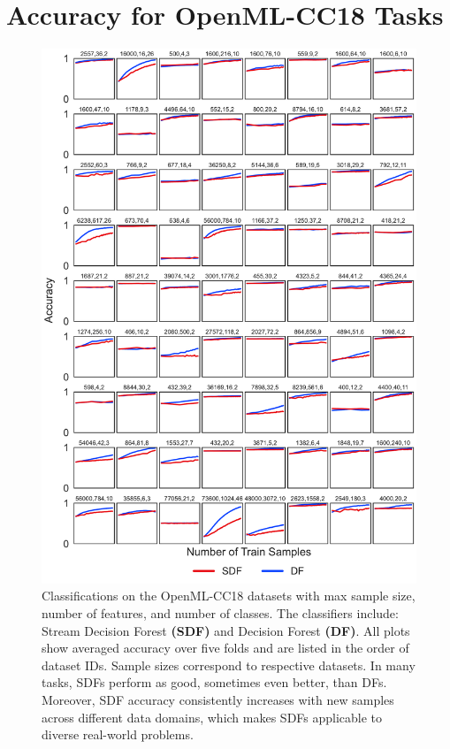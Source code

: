 \clearpage

\section{Accuracy for OpenML-CC18 Tasks}
\label{app:cc18}

\begin{figure}[!htpb]
\centering
\includegraphics[width=0.75\columnwidth]{cc18_wide}
  \caption{Classifications on the OpenML-CC18 datasets with max sample size, number of features, and number of classes. The classifiers include: Stream Decision Forest \textbf{(SDF)} and Decision Forest \textbf{(DF)}. 
  All plots show averaged accuracy over five folds and are listed in the order of dataset IDs. Sample sizes correspond to respective datasets. In many tasks, SDFs perform as good, sometimes even better, than DFs. Moreover, SDF accuracy consistently increases with new samples across different data domains, which makes SDFs applicable to diverse real-world problems.
  }
\label{fig:cc18}
\end{figure}